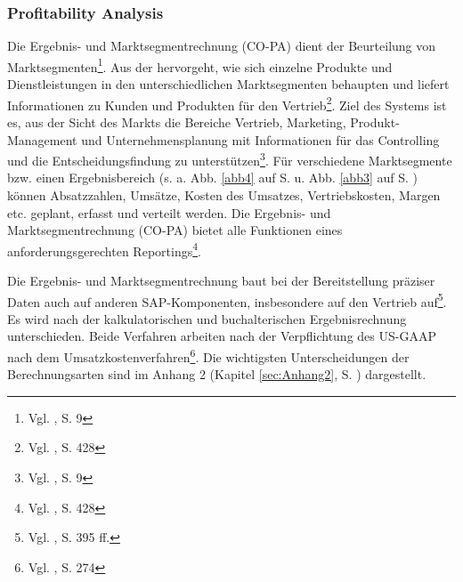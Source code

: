 \subsubsection{Profitability Analysis} %
Die Ergebnis- und Marktsegmentrechnung (CO-PA) dient der Beurteilung von Marktsegmenten\footnote{Vgl. \cite{SAPCOPA2001}, S. 9}.
Aus der hervorgeht, wie sich einzelne Produkte und Dienstleistungen in den unterschiedlichen Marktsegmenten behaupten und liefert Informationen zu Kunden und Produkten für den Vertrieb\footnote{Vgl. \cite{Patel2009}, S. 428}.
Ziel des Systems ist es, aus der Sicht des Markts die Bereiche Vertrieb, Marketing, Produkt-Management und Unternehmensplanung mit Informationen für das Controlling und die Entscheidungsfindung zu unterstützen\footnote{Vgl. \cite{SAPCOPA2001}, S. 9}.
Für verschiedene Marktsegmente bzw. einen Ergebnisbereich (s. a. Abb. \ref{abb4} auf S. \pageref{abb4} u. Abb. \ref{abb3} auf S. \pageref{abb3}) können Absatzzahlen, Umsätze, Kosten des Umsatzes, Vertriebskosten, Margen etc. geplant, erfasst und verteilt werden. Die Ergebnis- und Marktsegmentrechnung (CO-PA) bietet alle Funktionen eines anforderungsgerechten Reportings\footnote{Vgl. \cite{Patel2009}, S. 428}.

Die Ergebnis- und Marktsegmentrechnung baut bei der Bereitstellung präziser Daten auch auf anderen SAP-Komponenten, insbesondere auf den Vertrieb auf\footnote{Vgl. \cite{Patel2009}, S. 395 ff.}. Es wird nach der kalkulatorischen und buchalterischen Ergebnisrechnung unterschieden. Beide Verfahren arbeiten nach der Verpflichtung des US-GAAP nach dem Umsatzkostenverfahren\footnote{Vgl. \cite{Klein2010}, S. 274}. Die wichtigsten Unterscheidungen der Berechnungsarten sind im Anhang 2 (Kapitel \ref{sec:Anhang2}, S. \pageref{sec:Anhang2}) dargestellt.
